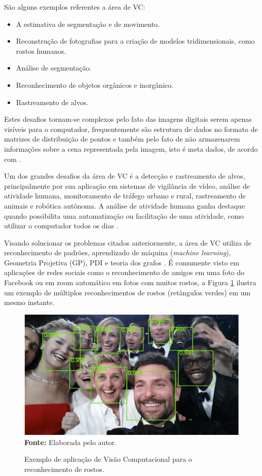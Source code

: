 São alguns exemplos referentes a área de VC: 
\begin{itemize}
\item A estimativa de segmentação e de movimento.
\item Reconstrução de fotografias para a criação de modelos tridimensionais, como rostos humanos.
\item Análise de segmentação.
\item Reconhecimento de objetos orgânicos e inorgânico.
\item Rastreamento de alvos.
\end{itemize}

Estes desafios tornam-se complexos pelo fato das imagens digitais serem apenas visíveis para o computador, frequentemente são estrutura de dados no formato de matrizes de distribuição de pontos e também pelo fato de não armazenarem informações sobre a cena representada pela imagem, isto é meta dados, de acordo com .

Um dos grandes desafios da área de VC é a detecção e rastreamento de alvos, principalmente por sua aplicação em sistemas de vigilância de vídeo, análise de atividade humana, monitoramento de tráfego urbano e rural, rastreamento de animais e robótica autônoma. A análise de atividade humana ganha destaque quando possibilita uma automatização ou facilitação de uma atividade, como utilizar o computador todos os dias \cite{alaya2012multipeople-UPPERCASE}.

Visando solucionar os problemas citados anteriormente, a área de VC utiliza de reconhecimento de padrões, aprendizado de máquina (\textit{machine learning}), Geometria Projetiva (GP), PDI e teoria dos grafos \cite{prince2012computer}. É comumente visto em aplicações de redes sociais como o reconhecimento de amigos em uma foto do Facebook ou em zoom automático em fotos com muitos rostos, a Figura \ref{fig:exemplo-vc} ilustra um exemplo de múltiplos reconhecimentos de rostos (retângulos verdes) em um mesmo instante.

\begin{figure}[htbp]
\caption{Exemplo de aplicação de Visão Computacional para o reconhecimento de rostos.}
 \centering \includegraphics[scale=1]{img/figura-1.png} 
 {\fontsize{11}{11}\selectfont \textbf{Fonte:} Elaborada pelo autor.}
\label{fig:exemplo-vc}
\end{figure}

